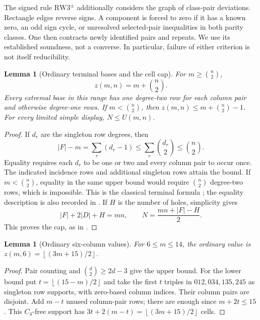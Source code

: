 \documentclass[11pt,a4paper]{article}
\newtheorem{lemma}[theorem]{Lemma}
\theoremstyle{definition}
\newcommand{\SG}{\mathrm{RW3}^{\pm}}
\newcommand{\fl}[1]{\left\lfloor #1\right\rfloor}
\begin{document}
The signed rule $\SG$ additionally considers the graph of class-pair
deviations. Rectangle edges reverse signs. A component is forced to zero
if it has a known zero, an odd sign cycle, or unresolved selected-pair
inequalities in both parity classes. One then contracts newly identified
pairs and repeats. We use its established soundness, not a converse.
In particular, failure of either criterion is not itself reducibility.

\begin{lemma}[Ordinary terminal bases and the cell cap]\label{lem:cap}
For $m\ge\binom n2$,
\begin{equation}\label{eq:ordinaryterminal}
 z(m,n)=m+\binom n2.
\end{equation}
Every extremal base in this range has one degree-two row for each column
pair and otherwise degree-one rows. If $m<\binom n2$, then
$z(m,n)\le m+\binom n2-1$. For every limited simple display,
$N\le U(m,n)$.
\end{lemma}
\begin{proof}
If $d_r$ are the singleton row degrees, then
\[
 |F|-m=\sum_r(d_r-1)\le\sum_r\binom{d_r}{2}\le\binom n2.
\]
Equality requires each $d_r$ to be one or two and every column pair to
occur once. The indicated incidence rows and additional singleton rows
attain the bound. If $m<\binom n2$, equality in the same upper
bound would require $\binom n2$ degree-two rows, which is impossible.
This is the classical terminal formula
\cite{Culik}; the equality description is also recorded in
\cite[Lemma~4.6]{XY}. If $H$ is the number of holes, simplicity gives
\begin{equation}\label{eq:cellidentity}
 |F|+2|D|+H=mn,
 \qquad N=\frac{mn+|F|-H}{2}.
\end{equation}
This proves the cap, as in \cite[Proposition~3.2]{LQ}.
\end{proof}

\begin{lemma}[Ordinary six-column values]\label{lem:ordinarysix}
For $6\le m\le14$, the ordinary value is
$z(m,6)=\fl{(3m+15)/2}$.
\end{lemma}
\begin{proof}
Pair counting and $\binom d2\ge2d-3$ give the upper bound.
For the lower bound put $t=\fl{(15-m)/2}$ and take the first $t$
triples in $012,034,135,245$ as singleton row supports, with
zero-based column indices. Their column pairs are disjoint. Add
$m-t$ unused column-pair rows; there are enough since
$m+2t\le15$. This $C_4$-free support has
$3t+2(m-t)=\fl{(3m+15)/2}$ cells.
\end{proof}
\end{document}
